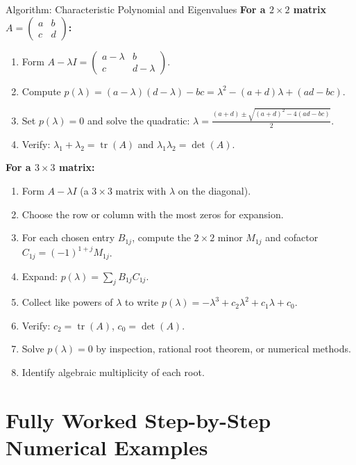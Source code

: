\documentclass[12pt,a4paper]{article}
\begin{document}
\begin{learnbox}{Algorithm: Characteristic Polynomial and Eigenvalues}
\textbf{For a $2\times 2$ matrix $A = \begin{pmatrix} a & b \\ c & d \end{pmatrix}$:}
\begin{enumerate}[leftmargin=*, label=\textbf{Step \arabic*.}]
  \item Form $A - \lambda I = \begin{pmatrix} a-\lambda & b \\ c & d-\lambda \end{pmatrix}$.
  \item Compute $p(\lambda) = (a-\lambda)(d-\lambda) - bc = \lambda^2 - (a+d)\lambda + (ad-bc)$.
  \item Set $p(\lambda) = 0$ and solve the quadratic: $\lambda = \frac{(a+d) \pm \sqrt{(a+d)^2 - 4(ad-bc)}}{2}$.
  \item Verify: $\lambda_1 + \lambda_2 = \operatorname{tr}(A)$ and $\lambda_1\lambda_2 = \det(A)$.
\end{enumerate}

\textbf{For a $3\times 3$ matrix:}
\begin{enumerate}[leftmargin=*, label=\textbf{Step \arabic*.}]
  \item Form $A - \lambda I$ (a $3\times 3$ matrix with $\lambda$ on the diagonal).
  \item Choose the row or column with the most zeros for expansion.
  \item For each chosen entry $B_{1j}$, compute the $2\times 2$ minor $M_{1j}$ and cofactor $C_{1j} = (-1)^{1+j}M_{1j}$.
  \item Expand: $p(\lambda) = \sum_j B_{1j} C_{1j}$.
  \item Collect like powers of $\lambda$ to write $p(\lambda) = -\lambda^3 + c_2\lambda^2 + c_1\lambda + c_0$.
  \item Verify: $c_2 = \operatorname{tr}(A)$, $c_0 = \det(A)$.
  \item Solve $p(\lambda) = 0$ by inspection, rational root theorem, or numerical methods.
  \item Identify algebraic multiplicity of each root.
\end{enumerate}
\end{learnbox}

\section{Fully Worked Step-by-Step Numerical Examples}
\end{document}
